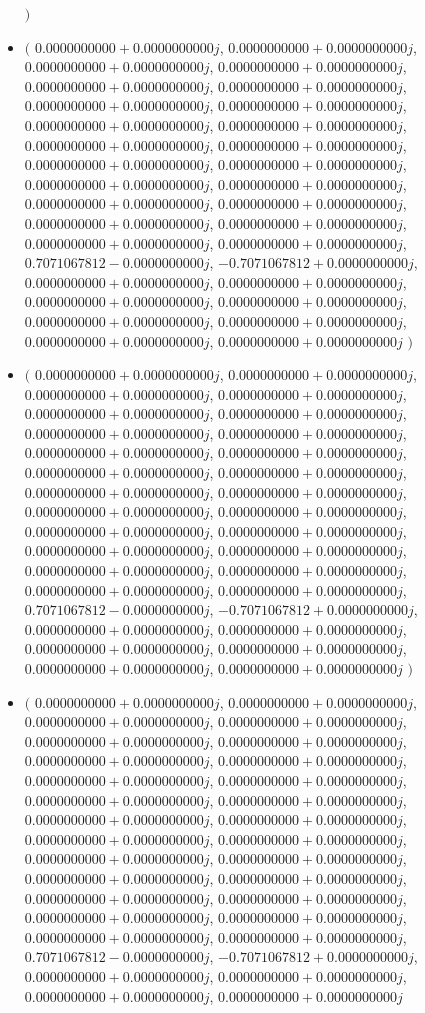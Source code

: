 \documentclass[14pt,a4paper]{article}
\begin{document}
\begin{itemize}
$\big)$
\item
$\big($
$0.0000000000+0.0000000000j$, $0.0000000000+0.0000000000j$, $0.0000000000+0.0000000000j$, $0.0000000000+0.0000000000j$, $0.0000000000+0.0000000000j$, $0.0000000000+0.0000000000j$, $0.0000000000+0.0000000000j$, $0.0000000000+0.0000000000j$, $0.0000000000+0.0000000000j$, $0.0000000000+0.0000000000j$, $0.0000000000+0.0000000000j$, $0.0000000000+0.0000000000j$, $0.0000000000+0.0000000000j$, $0.0000000000+0.0000000000j$, $0.0000000000+0.0000000000j$, $0.0000000000+0.0000000000j$, $0.0000000000+0.0000000000j$, $0.0000000000+0.0000000000j$, $0.0000000000+0.0000000000j$, $0.0000000000+0.0000000000j$, $0.0000000000+0.0000000000j$, $0.0000000000+0.0000000000j$, $0.7071067812-0.0000000000j$, $-0.7071067812+0.0000000000j$, $0.0000000000+0.0000000000j$, $0.0000000000+0.0000000000j$, $0.0000000000+0.0000000000j$, $0.0000000000+0.0000000000j$, $0.0000000000+0.0000000000j$, $0.0000000000+0.0000000000j$, $0.0000000000+0.0000000000j$, $0.0000000000+0.0000000000j$
$\big)$
\item
$\big($
$0.0000000000+0.0000000000j$, $0.0000000000+0.0000000000j$, $0.0000000000+0.0000000000j$, $0.0000000000+0.0000000000j$, $0.0000000000+0.0000000000j$, $0.0000000000+0.0000000000j$, $0.0000000000+0.0000000000j$, $0.0000000000+0.0000000000j$, $0.0000000000+0.0000000000j$, $0.0000000000+0.0000000000j$, $0.0000000000+0.0000000000j$, $0.0000000000+0.0000000000j$, $0.0000000000+0.0000000000j$, $0.0000000000+0.0000000000j$, $0.0000000000+0.0000000000j$, $0.0000000000+0.0000000000j$, $0.0000000000+0.0000000000j$, $0.0000000000+0.0000000000j$, $0.0000000000+0.0000000000j$, $0.0000000000+0.0000000000j$, $0.0000000000+0.0000000000j$, $0.0000000000+0.0000000000j$, $0.0000000000+0.0000000000j$, $0.0000000000+0.0000000000j$, $0.7071067812-0.0000000000j$, $-0.7071067812+0.0000000000j$, $0.0000000000+0.0000000000j$, $0.0000000000+0.0000000000j$, $0.0000000000+0.0000000000j$, $0.0000000000+0.0000000000j$, $0.0000000000+0.0000000000j$, $0.0000000000+0.0000000000j$
$\big)$
\item
$\big($
$0.0000000000+0.0000000000j$, $0.0000000000+0.0000000000j$, $0.0000000000+0.0000000000j$, $0.0000000000+0.0000000000j$, $0.0000000000+0.0000000000j$, $0.0000000000+0.0000000000j$, $0.0000000000+0.0000000000j$, $0.0000000000+0.0000000000j$, $0.0000000000+0.0000000000j$, $0.0000000000+0.0000000000j$, $0.0000000000+0.0000000000j$, $0.0000000000+0.0000000000j$, $0.0000000000+0.0000000000j$, $0.0000000000+0.0000000000j$, $0.0000000000+0.0000000000j$, $0.0000000000+0.0000000000j$, $0.0000000000+0.0000000000j$, $0.0000000000+0.0000000000j$, $0.0000000000+0.0000000000j$, $0.0000000000+0.0000000000j$, $0.0000000000+0.0000000000j$, $0.0000000000+0.0000000000j$, $0.0000000000+0.0000000000j$, $0.0000000000+0.0000000000j$, $0.0000000000+0.0000000000j$, $0.0000000000+0.0000000000j$, $0.7071067812-0.0000000000j$, $-0.7071067812+0.0000000000j$, $0.0000000000+0.0000000000j$, $0.0000000000+0.0000000000j$, $0.0000000000+0.0000000000j$, $0.0000000000+0.0000000000j$

\end{itemize}
\end{document}
